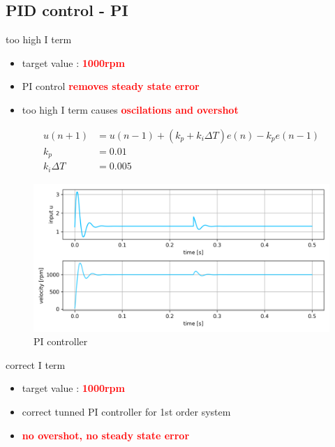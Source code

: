 \documentclass[12pt,twoside,onecolumn,openany,extrafontsizes,dvipsnames]{memoir}
\begin{document}
            \newpage
            \subsection{PID control - PI}
                
                too high I term 

                \begin{itemize}
                    \item  target value : \textcolor{red}{\textbf {1000rpm}}
                    \item  PI control \textcolor{red}{\textbf {removes steady state error}}
                    \item  too high I term causes \textcolor{red}{\textbf {oscilations and overshot}}
                \end{itemize}
            
              
                \begin{align}
                    u(n+1) &= u(n-1) + (k_p + k_i\Delta T) e(n) - k_pe(n-1) \\
                    k_p    &= 0.01 \\
                    k_i\Delta T    &= 0.005
                \end{align}
                
                
                \begin{figure}[!htb]
                    \centering
                    \includegraphics[scale=0.8]{../images/motor_control/pid_pi_control_0.png}
                    \caption{PI controller}
                    \label{fig:pi_controller}
                \end{figure}

                correct I term

                \begin{itemize}
                    \item  target value : \textcolor{red}{\textbf {1000rpm}}
                    \item  correct tunned PI controller for 1st order system
                    \item  \textcolor{red}{\textbf {no overshot, no steady state error}}
                \end{itemize}
                
\end{document}
